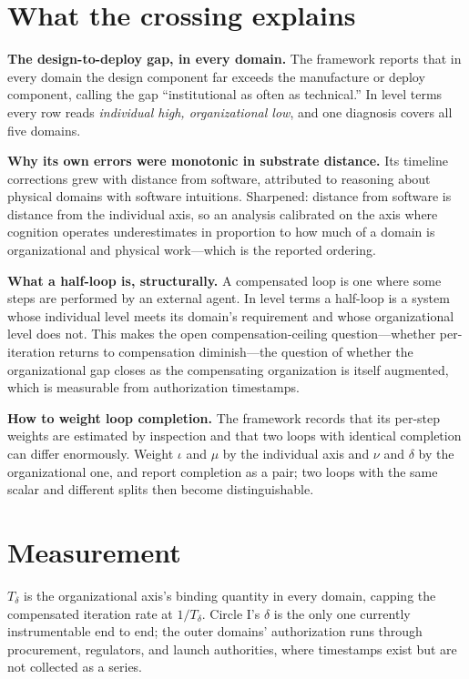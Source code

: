 \documentclass[11pt]{article}
\newcommand{\Td}{\ensuremath{T_\delta}}
\begin{document}
\section{What the crossing explains}\label{sec:explains}

\textbf{The design-to-deploy gap, in every domain.} The framework reports that in every domain the design component far exceeds the manufacture or deploy component, calling the gap ``institutional as often as technical.'' In level terms every row reads \emph{individual high, organizational low}, and one diagnosis covers all five domains.

\textbf{Why its own errors were monotonic in substrate distance.} Its timeline corrections grew with distance from software, attributed to reasoning about physical domains with software intuitions. Sharpened: distance from software is distance from the individual axis, so an analysis calibrated on the axis where cognition operates underestimates in proportion to how much of a domain is organizational and physical work---which is the reported ordering.

\textbf{What a half-loop is, structurally.} A compensated loop is one where some steps are performed by an external agent. In level terms a half-loop is a system whose individual level meets its domain's requirement and whose organizational level does not. This makes the open compensation-ceiling question---whether per-iteration returns to compensation diminish---the question of whether the organizational gap closes as the compensating organization is itself augmented, which is measurable from authorization timestamps.

\textbf{How to weight loop completion.} The framework records that its per-step weights are estimated by inspection and that two loops with identical completion can differ enormously. Weight $\iota$ and $\mu$ by the individual axis and $\nu$ and $\delta$ by the organizational one, and report completion as a pair; two loops with the same scalar and different splits then become distinguishable.

\section{Measurement}\label{sec:measure}

\Td{} is the organizational axis's binding quantity in every domain, capping the compensated iteration rate at $1/\Td$. Circle I's $\delta$ is the only one currently instrumentable end to end; the outer domains' authorization runs through procurement, regulators, and launch authorities, where timestamps exist but are not collected as a series.
\end{document}
